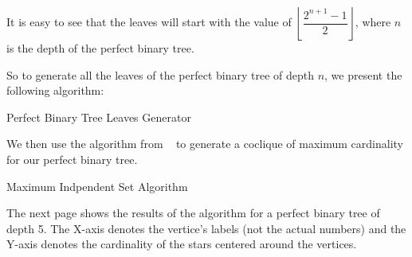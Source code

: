 \documentclass{amsart}
\theoremstyle{definition}
\begin{document}
\begin{appendix}
It is easy to see that the leaves will start with the value of $\left\lfloor\dfrac{2^{n + 1} - 1}{2}\right\rfloor$, where $n$ is the depth of the perfect binary tree.

\newpage
So to generate all the leaves of the perfect binary tree of depth $n$, we present the following algorithm:

\begin{algorithm}[hbt!]
  \caption{Perfect Binary Tree Leaves Generator}\label{alg:leaves-generator}


\end{algorithm}

We then use the algorithm from ~\cite{Niskanen2003CliquerUG} to generate a coclique of maximum cardinality for our perfect binary tree.

\begin{algorithm}[hbt!]
  \caption{Maximum Indpendent Set Algorithm}\label{alg:max-independent-set}


\end{algorithm}


The next page shows the results of the algorithm for a perfect binary tree of depth 5. The X-axis denotes the vertice's labels (not the actual numbers) and the Y-axis denotes the cardinality of the stars centered around the vertices.


\end{appendix}
\end{document}
